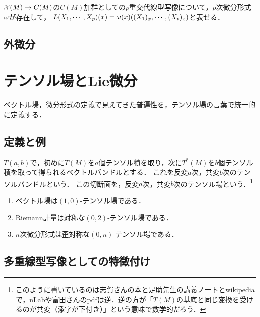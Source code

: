 \documentclass[uplatex,dvipdfmx]{jsreport}
\begin{document}
\begin{theorem}
    $\mathcal{X}(M)\to C(M)$の$C(M)$加群としての$p$重交代線型写像について，$p$次微分形式$\omega$が存在して，
    $L(X_1,\cdots,X_p)(x)=\omega(x)((X_1)_x,\cdots,(X_p)_x)$と表せる．
\end{theorem}

\subsection{外微分}

\section{テンソル場とLie微分}

\begin{tcolorbox}[colframe=ForestGreen, colback=ForestGreen!10!white,breakable,colbacktitle=ForestGreen!40!white,coltitle=black,fonttitle=\bfseries\sffamily,
title=]
    ベクトル場，微分形式の定義で見えてきた普遍性を，テンソル場の言葉で統一的に定義する．
\end{tcolorbox}

\subsection{定義と例}

\begin{notation}
    $T(a,b)$で，初めに$T(M)$を$a$個テンソル積を取り，次に$T^*(M)$を$b$個テンソル積を取って得られるベクトルバンドルとする．
    これを反変$a$次，共変$b$次のテンソルバンドルという．
    この切断面を，反変$a$次，共変$b$次のテンソル場という．\footnote{このように書いているのは志賀さんの本と足助先生の講義ノートとwikipediaで，nLabや富田さんのpdfは逆．逆の方が「$T(M)$の基底と同じ変換を受けるのが共変（添字が下付き）」という意味で数学的だろう．}
\end{notation}

\begin{example}\mbox{}
    \begin{enumerate}
        \item ベクトル場は$(1,0)$-テンソル場である．
        \item Riemann計量は対称な$(0,2)$-テンソル場である．
        \item $n$次微分形式は歪対称な$(0,n)$-テンソル場である．
    \end{enumerate}
\end{example}

\subsection{多重線型写像としての特徴付け}
\end{document}
